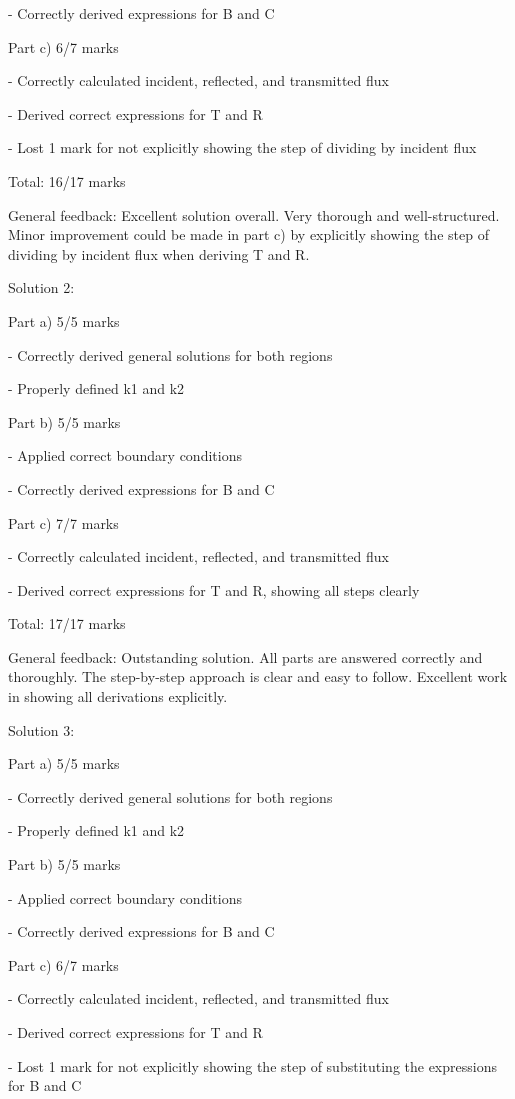 \documentclass[a4paper,11pt]{article}
\begin{document}
- Correctly derived expressions for B and C

Part c) 6/7 marks

- Correctly calculated incident, reflected, and transmitted flux

- Derived correct expressions for T and R

- Lost 1 mark for not explicitly showing the step of dividing by incident flux

Total: 16/17 marks

General feedback: Excellent solution overall. Very thorough and well-structured. Minor improvement could be made in part c) by explicitly showing the step of dividing by incident flux when deriving T and R.

Solution 2:

Part a) 5/5 marks

- Correctly derived general solutions for both regions

- Properly defined k1 and k2

Part b) 5/5 marks

- Applied correct boundary conditions

- Correctly derived expressions for B and C

Part c) 7/7 marks

- Correctly calculated incident, reflected, and transmitted flux

- Derived correct expressions for T and R, showing all steps clearly

Total: 17/17 marks

General feedback: Outstanding solution. All parts are answered correctly and thoroughly. The step-by-step approach is clear and easy to follow. Excellent work in showing all derivations explicitly.

Solution 3:

Part a) 5/5 marks

- Correctly derived general solutions for both regions

- Properly defined k1 and k2

Part b) 5/5 marks

- Applied correct boundary conditions

- Correctly derived expressions for B and C

Part c) 6/7 marks

- Correctly calculated incident, reflected, and transmitted flux

- Derived correct expressions for T and R

- Lost 1 mark for not explicitly showing the step of substituting the expressions for B and C
\end{document}
